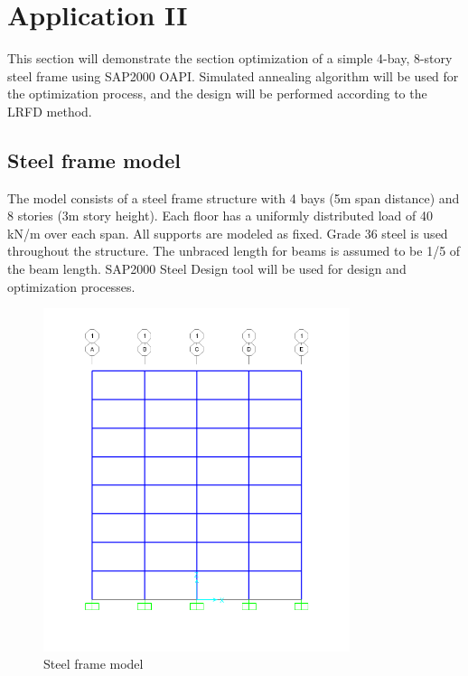 \section{Application II}
This section will demonstrate the section optimization of a simple 4-bay, 8-story steel frame using SAP2000 OAPI. Simulated annealing algorithm will be used for the optimization process, and the design will be performed according to the LRFD method.


\subsection{Steel frame model}
The model consists of a steel frame structure with 4 bays (5m span distance) and 8 stories (3m story height). Each floor has a uniformly distributed load of 40 kN/m over each span. All supports are modeled as fixed. Grade 36 steel is used throughout the structure. The unbraced length for beams is assumed to be 1/5 of the beam length. SAP2000 Steel Design tool will be used for design and optimization processes.

\begin{figure}[H]
    \centering
    \includegraphics[width=0.8\textwidth]{weeks_new/imgs/exmp7_fig2.png}
    \caption{Steel frame model}
    \label{fig:model}
\end{figure}

